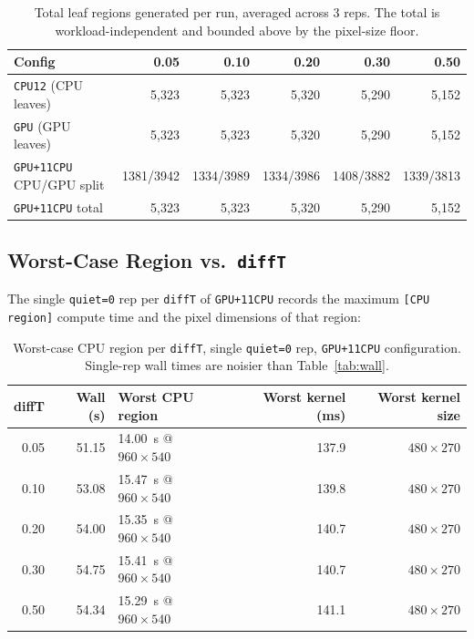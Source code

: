 \documentclass[
	english,
	letterpaper, oneside
]{article}
\begin{document}
\begin{table}[H]
    \centering
    \caption{Total leaf regions generated per run, averaged across 3
             reps. The total is workload-independent and bounded above
             by the pixel-size floor.}
    \label{tab:leaves}
    \begin{tabular}{lrrrrr}
        \hline
        \textbf{Config} & \textbf{0.05} & \textbf{0.10} & \textbf{0.20} & \textbf{0.30} & \textbf{0.50} \\
        \hline
        \texttt{CPU12} (CPU leaves)        & 5{,}323 & 5{,}323 & 5{,}320 & 5{,}290 & 5{,}152 \\
        \texttt{GPU} (GPU leaves)          & 5{,}323 & 5{,}323 & 5{,}320 & 5{,}290 & 5{,}152 \\
        \texttt{GPU+11CPU} CPU/GPU split   & 1381/3942 & 1334/3989 & 1334/3986 & 1408/3882 & 1339/3813 \\
        \texttt{GPU+11CPU} total           & 5{,}323 & 5{,}323 & 5{,}320 & 5{,}290 & 5{,}152 \\
        \hline
    \end{tabular}
\end{table}

\subsection{Worst-Case Region vs.\ \texttt{diffT}}

The single \texttt{quiet=0} rep per \texttt{diffT} of \texttt{GPU+11CPU}
records the maximum \texttt{[CPU region]} compute time and the pixel
dimensions of that region:

\begin{table}[H]
    \centering
    \caption{Worst-case CPU region per \texttt{diffT}, single \texttt{quiet=0}
             rep, \texttt{GPU+11CPU} configuration. Single-rep wall
             times are noisier than Table~\ref{tab:wall}.}
    \label{tab:worst}
    \begin{tabular}{rrlrr}
        \hline
        \textbf{diffT} & \textbf{Wall (s)} & \textbf{Worst CPU region} & \textbf{Worst kernel (ms)} & \textbf{Worst kernel size} \\
        \hline
        0.05 & 51.15 & 14.00~s @ $960\times540$ & 137.9 & $480\times270$ \\
        0.10 & 53.08 & 15.47~s @ $960\times540$ & 139.8 & $480\times270$ \\
        0.20 & 54.00 & 15.35~s @ $960\times540$ & 140.7 & $480\times270$ \\
        0.30 & 54.75 & 15.41~s @ $960\times540$ & 140.7 & $480\times270$ \\
        0.50 & 54.34 & 15.29~s @ $960\times540$ & 141.1 & $480\times270$ \\
        \hline
    \end{tabular}
\end{table}
\end{document}
